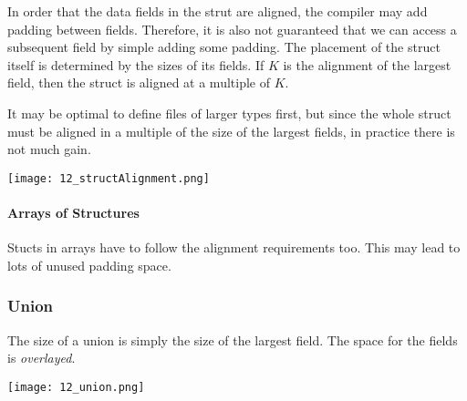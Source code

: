 In order that the data fields in the strut are aligned, the compiler may add padding between fields. Therefore, it is also not guaranteed that we can access a subsequent field by simple adding some padding. The placement of the struct itself is determined by the sizes of its fields. If $K$ is the alignment of the largest field, then the struct is aligned at a multiple of $K$.

It may be optimal to define files of larger types first, but since the whole struct must be aligned in a multiple of the size of the largest fields, in practice there is not much gain.

\texttt{[image: 12\_structAlignment.png]}

\paragraph{Arrays of Structures}
Stucts in arrays have to follow the alignment requirements too. This may lead to lots of unused padding space.

\subsubsection{Union}
The size of a union is simply the size of the largest field. The space for the fields is \textit{overlayed}.

\texttt{[image: 12\_union.png]}
